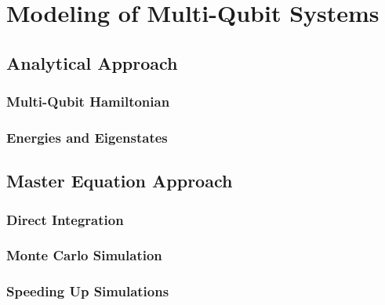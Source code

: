 \chapter{Modeling of Multi-Qubit Systems}


\section{Analytical Approach}

\subsection{Multi-Qubit Hamiltonian}


\subsection{Energies and Eigenstates}


\section{Master Equation Approach}


\subsection{Direct Integration}


\subsection{Monte Carlo Simulation}


\subsection{Speeding Up Simulations}

